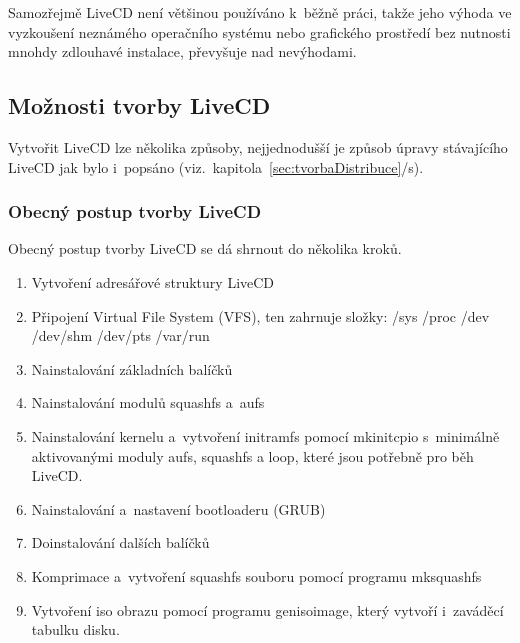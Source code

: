 \documentclass[a4paper,12pt]{article}
\newcommand{\odkazNaKapitolu}[1]{(viz.~kapitola~\ref{#1}/s\pageref{#1})}
\begin{document}
Samozřejmě LiveCD není většinou používáno k~běžně práci, takže jeho výhoda ve vyzkoušení neznámého operačního systému nebo grafického prostředí bez nutnosti mnohdy zdlouhavé instalace, převyšuje nad nevýhodami.
\subsection{Možnosti tvorby LiveCD}
Vytvořit LiveCD lze několika způsoby, nejjednodušší je způsob úpravy stávajícího LiveCD jak bylo i~popsáno \odkazNaKapitolu{sec:tvorbaDistribuce}. 

\subsubsection{Obecný postup tvorby LiveCD}
Obecný postup tvorby LiveCD se dá shrnout do několika kroků.
\begin{enumerate}
 \item Vytvoření adresářové struktury LiveCD
 \item Připojení Virtual File System (VFS), ten zahrnuje složky: /sys /proc /dev /dev/shm /dev/pts /var/run
 \item Nainstalování základních balíčků
 \item Nainstalování modulů squashfs a~aufs
 \item Nainstalování kernelu a~vytvoření initramfs pomocí mkinitcpio s~minimálně aktivovanými moduly aufs, squashfs a loop, které jsou potřebně pro běh LiveCD.
 \item Nainstalování a~nastavení bootloaderu (GRUB)
 \item Doinstalování dalších balíčků
 \item Komprimace a~vytvoření squashfs souboru pomocí programu mksquashfs
 \item Vytvoření iso obrazu pomocí programu genisoimage, který vytvoří i~zaváděcí tabulku disku.
\end{enumerate}
\end{document}
